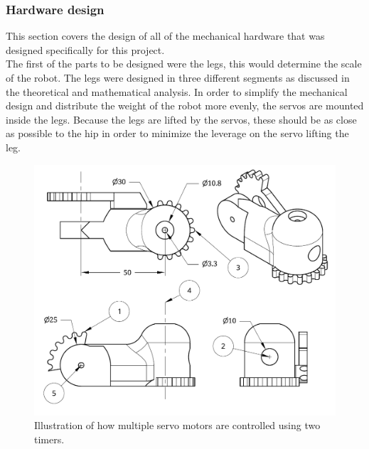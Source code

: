 \subsubsection{Hardware design}
This section covers the design of all of the mechanical hardware that was designed specifically for this project.\\

The first of the parts to be designed were the legs, this would determine the scale of the robot. The legs were designed in three different segments as discussed in the theoretical and mathematical analysis. In order to simplify the mechanical design and distribute the weight of the robot more evenly, the servos are mounted inside the legs. Because the legs are lifted by the servos, these should be as close as possible to the hip in order to minimize the leverage on the servo lifting the leg.\\

\begin{figure}[H]
\centering
\includegraphics[scale = 0.8]{pics/DrawingA.pdf}
\caption{Illustration of how multiple servo motors are controlled using two timers.}
\label{fig:DrawingA}
\end{figure}

